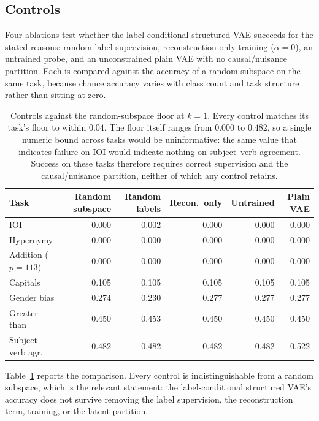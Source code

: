 \documentclass{article}
\begin{document}
\subsection{Controls}
\label{sec:controls}

Four ablations test whether the label-conditional structured VAE succeeds for the
stated reasons: random-label supervision, reconstruction-only training
($\alpha = 0$), an untrained probe, and an unconstrained plain VAE with no
causal/nuisance partition. Each is compared against the accuracy of a random
subspace on the same task, because chance accuracy varies with class count and
task structure rather than sitting at zero.

\begin{table}[t]
\centering
\small
\setlength{\tabcolsep}{5pt}
\begin{tabular}{l r rrrr}
\toprule
Task & Random subspace & Random labels & Recon.\ only & Untrained & Plain VAE \\
\midrule
IOI                  & 0.000 & 0.002 & 0.000 & 0.000 & 0.000 \\
Hypernymy            & 0.000 & 0.000 & 0.000 & 0.000 & 0.000 \\
Addition ($p{=}113$) & 0.000 & 0.000 & 0.000 & 0.000 & 0.000 \\
Capitals             & 0.105 & 0.105 & 0.105 & 0.105 & 0.105 \\
Gender bias          & 0.274 & 0.230 & 0.277 & 0.277 & 0.277 \\
Greater-than         & 0.450 & 0.453 & 0.450 & 0.450 & 0.450 \\
Subject--verb agr.\  & 0.482 & 0.482 & 0.482 & 0.482 & 0.522 \\
\bottomrule
\end{tabular}
\caption{Controls against the random-subspace floor at $k = 1$. Every control
matches its task's floor to within $0.04$. The floor itself ranges from $0.000$
to $0.482$, so a single numeric bound across tasks would be uninformative: the
same value that indicates failure on IOI would indicate nothing on subject--verb
agreement. Success on these tasks therefore requires correct supervision and the
causal/nuisance partition, neither of which any control retains.}
\label{tab:controls_main}
\end{table}

Table~\ref{tab:controls_main} reports the comparison. Every control is
indistinguishable from a random subspace, which is the relevant statement: the
label-conditional structured VAE's accuracy does not survive removing the label
supervision, the reconstruction term, training, or the latent partition.
\end{document}
